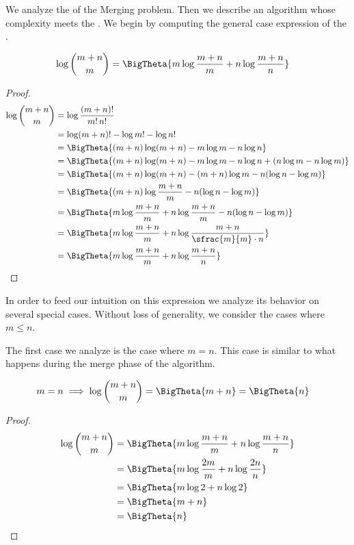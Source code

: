 We analyze the \ITLB of the Merging problem. Then we
describe an algorithm whose complexity meets the \ITLB. We begin by
computing the general case expression of the \ITLB.
\begin{lemma}
\begin{align*}
\log\binom{m+n}{m} &= \BigTheta{m \log\frac{m+n}{m} + n \log\frac{m+n}{n}}
\end{align*}
\end{lemma}
\begin{proof}
\begin{align*}
\log\binom{m+n}{m} &= \log\frac{(m+n)!}{m! \, n!}\\
&= \log(m+n)! - \log m! - \log n!\\
&= \BigTheta{(m+n) \log(m+n) - m \log m - n \log n}\\
&= \BigTheta{(m+n) \log(m+n) - m \log m - n \log n + (n \log m - n \log m)}\\
&= \BigTheta{(m+n) \log(m+n) - (m+n) \log m - n (\log n - \log m)}\\
&= \BigTheta{(m+n) \log\frac{m+n}{m} - n (\log n - \log m)}\\
&= \BigTheta{m \log\frac{m+n}{m} + n \log\frac{m+n}{m} - n (\log n - \log m)}\\
&= \BigTheta{m \log\frac{m+n}{m} + n \log\frac{m+n}{\sfrac{m}{m} \cdot n}}\\
&= \BigTheta{m \log\frac{m+n}{m} + n \log\frac{m+n}{n}}\qedhere
\end{align*}
\end{proof}

In order to feed our intuition on this expression we analyze its behavior
on several special cases. Without loss of generality, we consider the cases
where \(m \leq n\).

The first case we analyze is the case where $m = n$. This case is similar
to what happens during the merge phase of the \mergesort algorithm.
\begin{lemma}
\begin{align*}
m = n &\implies \log\binom{m+n}{m} = \BigTheta{m + n} = \BigTheta{n}
\end{align*}
\end{lemma}
\begin{proof}
\begin{align*}
\log\binom{m+n}{m} &= \BigTheta{m \log\frac{m+n}{m} + n \log\frac{m+n}{n}}\\
&= \BigTheta{m \log\frac{2m}{m} + n \log\frac{2n}{n}}\\
&= \BigTheta{m \log 2 + n \log 2}\\
&= \BigTheta{m + n}\\
&= \BigTheta{n}\qedhere
\end{align*}
\end{proof}

